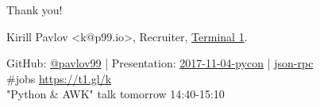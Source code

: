 \documentclass[unicode, notheorems, aspectratio=169]{beamer}
\begin{document}
\begin{frame}
\begin{center}
{\huge Thank you!}

\vfill
Kirill Pavlov <k@p99.io>, Recruiter, \href{https://t1.gl/k}{Terminal 1}.

{\small
GitHub: \href{https://github.com/pavlov99}{@pavlov99} |
Presentation: \href{https://github.com/pavlov99/presentations/tree/master/2017-11-04-pycon}{2017-11-04-pycon} |
\href{https://github.com/pavlov99/json-rpc}{json-rpc} \\
\#jobs \href{https://t1.gl/k}{https://t1.gl/k} \\
"Python \& AWK" talk tomorrow 14:40-15:10
}
\end{center}
\end{frame}
\end{document}
